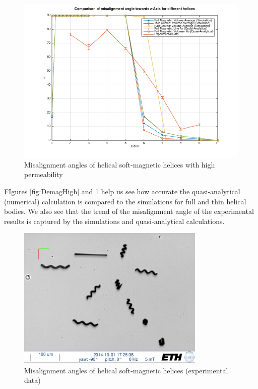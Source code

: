\begin{figure}[ht]
	\centering
  \includegraphics[width=1\textwidth]{Pictures/MisalignmentAngles_high.png}
	\caption{Misalignment angles of helical soft-magnetic helices with high permeability}
	\label{fig:MisalignmentAngles_high}
\end{figure}

FIgures \ref{fig:DemagHigh} and \ref{fig:MisalignmentAngles_high} help us see how accurate the quasi-analytical (numerical) calculation is compared to the simulations for full and thin helical bodies. We also see that the trend of the misalignment angle of the experimental results is captured by the simulations and quasi-analytical calculations.


\begin{figure}[ht]
	\centering
  \includegraphics[width=0.8\textwidth]{Pictures/MisalignmentExperimental.png}
	\caption{Misalignment angles of helical soft-magnetic helices (experimental data)}
	\label{fig:MisalignmentExperimental}
\end{figure}


